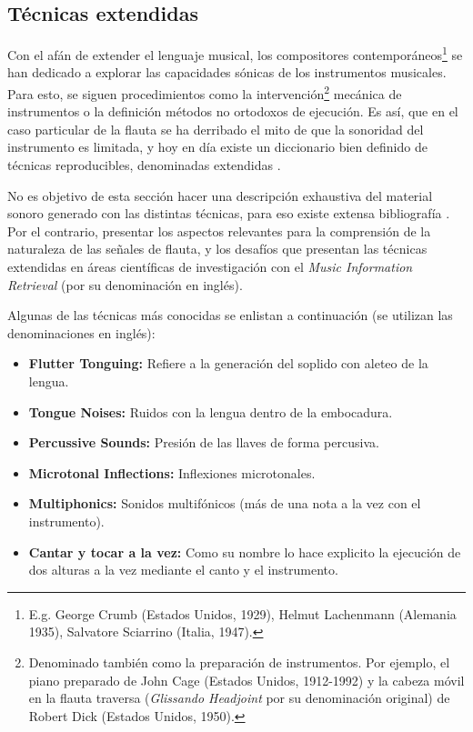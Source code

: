 \documentclass
  [ams,pdfout]%
	{aeslac}
\begin{document}
%
\subsection{Técnicas extendidas}

Con el afán de extender el lenguaje musical, los compositores contemporáneos\footnote{E.g. George Crumb (Estados Unidos, 1929), Helmut Lachenmann (Alemania 1935), Salvatore Sciarrino (Italia, 1947).} se han dedicado a explorar las capacidades sónicas de los instrumentos musicales. Para esto, se siguen procedimientos como la intervención\footnote{Denominado también como la preparación de instrumentos. Por ejemplo, el piano preparado de John Cage (Estados Unidos, 1912-1992) y la cabeza móvil en la flauta traversa (\textit{Glissando Headjoint} por su denominación original) de Robert Dick (Estados Unidos, 1950).} mecánica de instrumentos o la definición métodos no ortodoxos de ejecución. Es así, que en el caso particular de la flauta se ha derribado el mito de que la sonoridad del instrumento es limitada, y hoy en día existe un diccionario bien definido de técnicas reproducibles, denominadas extendidas \cite{dick1975other}. 

%
No es objetivo de esta sección hacer una descripción exhaustiva del material sonoro generado con las distintas técnicas, para eso existe extensa bibliografía \cite{samuel2002study,dick1975other}. Por el contrario, presentar los aspectos relevantes para la comprensión de la naturaleza de las señales de flauta, y los desafíos que presentan las técnicas extendidas en áreas científicas de investigación con el \textit{Music Information Retrieval} (por su denominación en inglés).   

%
Algunas de las técnicas más conocidas se enlistan a continuación (se utilizan las denominaciones en inglés):

\begin{itemize}

\item \textbf{Flutter Tonguing:} Refiere a la generación del soplido con aleteo de la lengua. 
\item \textbf{Tongue Noises:} Ruidos con la lengua dentro de la embocadura. 
\item \textbf{Percussive Sounds:} Presión de las llaves de forma percusiva.
\item \textbf{Microtonal Inflections:} Inflexiones microtonales.
\item \textbf{Multiphonics:} Sonidos multifónicos (más de una nota a la vez con el instrumento).
\item \textbf{Cantar y tocar a la vez:} Como su nombre lo hace explicito la ejecución de dos alturas a la vez mediante el canto y el instrumento.

\end{itemize}
\end{document}
